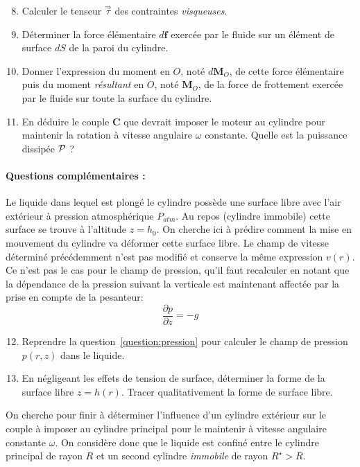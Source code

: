 \begin{enumerate}
\setcounter{enumi}{7}
\item
Calculer le tenseur $\stackrel{\Rightarrow}{\tau}$ des contraintes \textsl{visqueuses}.
\item
D\'eterminer la force \'el\'ementaire $d\mathbf{f}$ exerc\'ee
par le fluide sur un \'el\'ement de surface $dS$ de la paroi du cylindre.
\item
Donner l'expression du moment en $O$, not\'e $d\mathbf{M}_O$, de cette force \'el\'ementaire
puis du moment \textsl{r\'esultant} en $O$, not\'e $\mathbf{M}_O$, de la force de
frottement exerc\'ee par le fluide sur toute la surface du cylindre.
\item
En d\'eduire le couple $\mathbf{C}$ que devrait imposer le moteur au cylindre
pour maintenir la rotation \`a vitesse angulaire $\omega$ constante.
Quelle est la puissance dissip\'ee $\cal P$ ? 
\end{enumerate}

\paragraph{Questions complémentaires :}
Le liquide dans lequel est plong\'e le cylindre poss\`ede une surface libre
avec l'air ext\'erieur \`a pression atmosph\'erique $P_{atm}$.
Au repos (cylindre immobile) cette surface se trouve \`a l'altitude $z = h_0$. 
On cherche ici \`a pr\'edire comment la mise en mouvement du cylindre
va d\'eformer cette surface libre.
Le champ de vitesse d\'etermin\'e pr\'ec\'edemment n'est pas modifi\'e
et conserve la m\^eme expression $v(r)$.
Ce n'est pas le cas pour le champ de pression, qu'il faut recalculer
en notant que la d\'ependance de la pression suivant la verticale est
maintenant affect\'ee par la prise en compte de la pesanteur:
\[
\frac{\partial p}{\partial z} = -g
\]
\begin{enumerate}
\setcounter{enumi}{11}
\item
Reprendre la question~\ref{question:pression} pour calculer le champ
de pression $p(r, z)$ dans le liquide.
\item
En négligeant les effets de tension de surface, d\'eterminer 
la forme de la surface libre $z=h(r)$.
Tracer qualitativement la forme de surface libre.
\end{enumerate}

On cherche pour finir \`a d\'eterminer l'influence d'un
cylindre ext\'erieur sur le couple \`a imposer au cylindre
principal pour le maintenir \`a vitesse angulaire constante $\omega$.
On consid\`ere donc que le liquide est confin\'e entre le cylindre principal
de rayon $R$ et un second cylindre \textit{immobile} de rayon $R^\star > R$.

